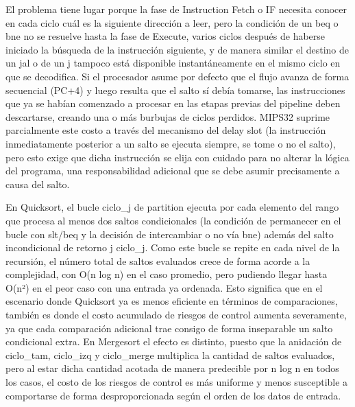 \documentclass[12pt, letterpaper]{article}
\begin{document}
El problema tiene lugar porque la fase de Instruction Fetch o IF necesita conocer en cada ciclo cuál es la siguiente dirección a leer, pero la condición de un beq o bne no se resuelve hasta la fase de Execute, varios ciclos después de haberse iniciado la búsqueda de la instrucción siguiente, y de manera similar el destino de un jal o de un j tampoco está disponible instantáneamente en el mismo ciclo en que se decodifica. Si el procesador asume por defecto que el flujo avanza de forma secuencial (PC+4) y luego resulta que el salto sí debía tomarse, las instrucciones que ya se habían comenzado a procesar en las etapas previas del pipeline deben descartarse, creando una o más burbujas de ciclos perdidos. MIPS32 suprime parcialmente este costo a través del mecanismo del delay slot (la instrucción inmediatamente posterior a un salto se ejecuta siempre, se tome o no el salto), pero esto exige que dicha instrucción se elija con cuidado para no alterar la lógica del programa, una responsabilidad adicional que se debe asumir precisamente a causa del salto.

En Quicksort, el bucle ciclo\_j de partition ejecuta por cada elemento del rango que procesa al menos dos saltos condicionales (la condición de permanecer en el bucle con slt/beq y la decisión de intercambiar o no vía bne) además del salto incondicional de retorno j ciclo\_j. Como este bucle se repite en cada nivel de la recursión, el número total de saltos evaluados crece de forma acorde a la complejidad, con O(n log n) en el caso promedio, pero pudiendo llegar hasta O(n²) en el peor caso con una entrada ya ordenada. Esto significa que en el escenario donde Quicksort ya es menos eficiente en términos de comparaciones, también es donde el costo acumulado de riesgos de control aumenta severamente, ya que cada comparación adicional trae consigo de forma inseparable un salto condicional extra. En Mergesort el efecto es distinto, puesto que la anidación de ciclo\_tam, ciclo\_izq y ciclo\_merge multiplica la cantidad de saltos evaluados, pero al estar dicha cantidad acotada de manera predecible por n log n en todos los casos, el costo de los riesgos de control es más uniforme y menos susceptible a comportarse de forma desproporcionada según el orden de los datos de entrada.
\end{document}
